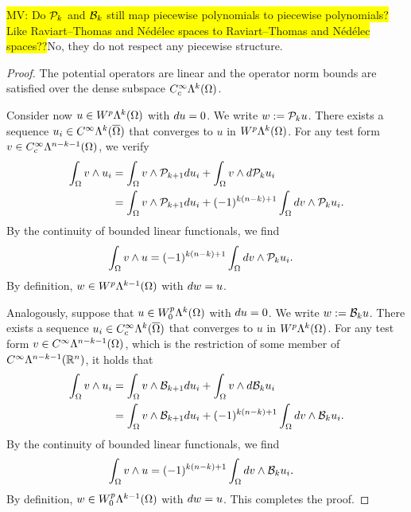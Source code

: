 \documentclass[10pt,a4paper]{article}
\newcommand{\todo}[1]{{\colorbox{yellow}{#1}}}
\newcommand{\mwl}[1]{{\color{red}#1}}
\begin{document}
\todo{MV: Do ${\mathcal P}_{k}$ and ${\mathcal B}_{k}$ still map piecewise polynomials to piecewise polynomials? Like Raviart--Thomas and N\'ed\'elec spaces to Raviart--Thomas and N\'ed\'elec spaces??}\mwl{No, they do not respect any piecewise structure.}

\begin{proof}
    The potential operators are linear and the operator norm bounds are satisfied over the dense subspace $C^{\infty}_{c}\Lambda^{k}(\Omega)$.
    
    Consider now $u \in W^{p}\Lambda^{k}(\Omega)$ with $d u = 0$. 
    We write $w := {\mathcal P}_{k  } u$. 
    There exists a sequence $u_{i} \in C^{\infty}\Lambda^{k}(\overline\Omega)$ that converges to $u$ in $W^{p}\Lambda^{k}(\Omega)$. 
    For any test form $v \in C^{\infty}_{c}\Lambda^{n-k-1}(\Omega)$, we verify 
    \begin{align*}
        \int_{\Omega} v \wedge u_{i} 
        &=
        \int_{\Omega} v \wedge {\mathcal P}_{k+1} d u_{i}
        +
        \int_{\Omega} v \wedge d {\mathcal P}_{k  } u_{i}
        \\&=
        \int_{\Omega} v \wedge {\mathcal P}_{k+1} d u_{i}
        +
        (-1)^{k(n-k)+1}
        \int_{\Omega} d v \wedge {\mathcal P}_{k  } u_{i}
        .
    \end{align*}
    By the continuity of bounded linear functionals, we find 
    \begin{align*}
        \int_{\Omega} v \wedge u 
        &=
        (-1)^{k(n-k)+1}
        \int_{\Omega} d v \wedge {\mathcal P}_{k  } u_{i}
        .
    \end{align*}
    By definition, $w \in W^{p}\Lambda^{k-1}(\Omega)$ with $d w = u$.
    
    
    Analogously, suppose that $u \in W^{p}_{0}\Lambda^{k}(\Omega)$ with $d u = 0$. 
    We write $w := {\mathcal B}_{k} u$. 
    There exists a sequence $u_{i} \in C^{\infty}_{c}\Lambda^{k}(\overline\Omega)$ that converges to $u$ in $W^{p}\Lambda^{k}(\Omega)$. 
    For any test form $v \in C^{\infty}\Lambda^{n-k-1}(\Omega)$, 
    which is the restriction of some member of $C^{\infty}\Lambda^{n-k-1}({\mathbb R}^{n})$, 
    it holds that 
    \begin{align*}
        \int_{\Omega} v \wedge u_{i} 
        &=
        \int_{\Omega} v \wedge {\mathcal B}_{k+1} d u_{i}
        +
        \int_{\Omega} v \wedge d {\mathcal B}_{k  } u_{i}
        \\&=
        \int_{\Omega} v \wedge {\mathcal B}_{k+1} d u_{i}
        +
        (-1)^{k(n-k)+1}
        \int_{\Omega} d v \wedge {\mathcal B}_{k  } u_{i}
        .
    \end{align*}
    By the continuity of bounded linear functionals, we find 
    \begin{align*}
        \int_{\Omega} v \wedge u 
        &=
        (-1)^{k(n-k)+1}
        \int_{\Omega} d v \wedge {\mathcal B}_{k  } u_{i}
        .
    \end{align*}
    By definition, $w \in W^{p}_{0}\Lambda^{k-1}(\Omega)$ with $d w = u$.
    This completes the proof. 
\end{proof}
\end{document}
